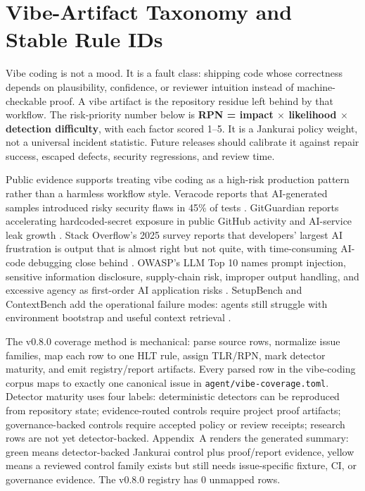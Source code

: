 \section{Vibe-Artifact Taxonomy and Stable Rule IDs}

Vibe coding is not a mood. It is a fault class: shipping code whose correctness depends on plausibility, confidence, or reviewer intuition instead of machine-checkable proof. A vibe artifact is the repository residue left behind by that workflow. The risk-priority number below is \textbf{RPN = impact $\times$ likelihood $\times$ detection difficulty}, with each factor scored 1--5. It is a Jankurai policy weight, not a universal incident statistic. Future releases should calibrate it against repair success, escaped defects, security regressions, and review time.

Public evidence supports treating vibe coding as a high-risk production pattern rather than a harmless workflow style. Veracode reports that AI-generated samples introduced risky security flaws in 45\% of tests \cite{veracodeGenaiCodeSecurity2025}. GitGuardian reports accelerating hardcoded-secret exposure in public GitHub activity and AI-service leak growth \cite{gitguardianSecretsSprawl2026,gitguardianSecretsSprawl2026Blog}. Stack Overflow's 2025 survey reports that developers' largest AI frustration is output that is almost right but not quite, with time-consuming AI-code debugging close behind \cite{stackOverflowAISurvey2025}. OWASP's LLM Top 10 names prompt injection, sensitive information disclosure, supply-chain risk, improper output handling, and excessive agency as first-order AI application risks \cite{owaspLlmTopTen2025}. SetupBench and ContextBench add the operational failure modes: agents still struggle with environment bootstrap and useful context retrieval \cite{setupBench2025,contextBench2026}.

The v0.8.0 coverage method is mechanical: parse source rows, normalize issue families, map each row to one HLT rule, assign TLR/RPN, mark detector maturity, and emit registry/report artifacts. Every parsed row in the vibe-coding corpus maps to exactly one canonical issue in \texttt{agent/vibe-coverage.toml}. Detector maturity uses four labels: deterministic detectors can be reproduced from repository state; evidence-routed controls require project proof artifacts; governance-backed controls require accepted policy or review receipts; research rows are not yet detector-backed. Appendix~A renders the generated summary: green means detector-backed Jankurai control plus proof/report evidence, yellow means a reviewed control family exists but still needs issue-specific fixture, CI, or governance evidence. The v0.8.0 registry has 0 unmapped rows.

